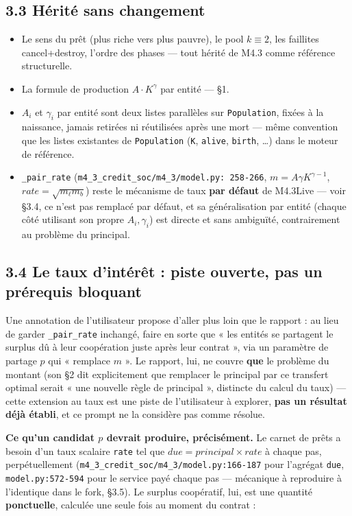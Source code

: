 \documentclass[11pt,a4paper]{article}
\newcommand{\code}[1]{\texttt{#1}}
\begin{document}
\subsection*{3.3 Hérité sans changement}

\begin{itemize}
\item Le sens du prêt (plus riche vers plus pauvre), le pool $k\equiv2$,
  les faillites cancel+destroy, l'ordre des phases --- tout hérité de
  M4.3 comme référence structurelle.
\item La formule de production $A\cdot K^{\gamma}$ par entité --- \S1.
\item $A_i$ et $\gamma_i$ par entité sont deux listes parallèles sur
  \code{Population}, fixées à la naissance, jamais retirées ni
  réutilisées après une mort --- même convention que les listes
  existantes de \code{Population} (\code{K}, \code{alive}, \code{birth},
  \ldots) dans le moteur de référence.
\item \code{\_pair\_rate} (\code{m4\_3\_credit\_soc/m4\_3/model.py:
  258-266}, $m=A\gamma K^{\gamma-1}$, $\mathit{rate}=\sqrt{m_\ell m_b}$)
  reste le mécanisme de taux \textbf{par défaut} de M4.3Live --- voir
  \S3.4, ce n'est pas remplacé par défaut, et sa généralisation par
  entité (chaque côté utilisant son propre $A_i,\gamma_i$) est directe
  et sans ambiguïté, contrairement au problème du principal.
\end{itemize}

\subsection*{3.4 Le taux d'intérêt : piste ouverte, pas un prérequis bloquant}

Une annotation de l'utilisateur propose d'aller plus loin que le
rapport : au lieu de garder \code{\_pair\_rate} inchangé, faire en sorte
que « les entités se partagent le surplus dû à leur coopération juste
après leur contrat », via un paramètre de partage $p$ qui « remplace
$m$ ». Le rapport, lui, ne couvre \textbf{que} le problème du montant
(son \S2 dit explicitement que remplacer le principal par ce transfert
optimal serait « une nouvelle règle de principal », distincte du calcul
du taux) --- cette extension au taux est une piste de l'utilisateur à
explorer, \textbf{pas un résultat déjà établi}, et ce prompt ne la
considère pas comme résolue.

\textbf{Ce qu'un candidat $p$ devrait produire, précisément.} Le carnet
de prêts a besoin d'un taux scalaire \code{rate} tel que
$\mathit{due} = \mathit{principal} \times \mathit{rate}$ à chaque pas,
perpétuellement (\code{m4\_3\_credit\_soc/m4\_3/model.py:166-187} pour
l'agrégat \code{due}, \code{model.py:572-594} pour le service payé chaque
pas --- mécanique à reproduire à l'identique dans le fork, \S3.5). Le
surplus coopératif, lui, est une quantité \textbf{ponctuelle}, calculée
une seule fois au moment du contrat :
\end{document}

